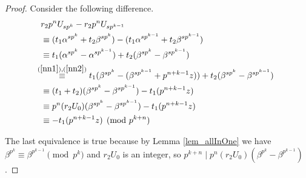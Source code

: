 \documentclass[preprint,12pt]{elsarticle}
\begin{document}
\begin{proof}
    Consider the following difference.
    \begin{equation}
        \begin{split}
        &r_2p^nU_{sp^k} - r_2p^nU_{sp^{k-1}}  
        \\ &\equiv (t_1\alpha^{sp^k}+t_2\beta^{sp^k}) -  (t_1\alpha^{sp^{k-1}}+t_2\beta^{sp^{k-1}}) 
        \\ &\equiv
        t_1(\alpha^{sp^k} - \alpha^{sp^{k-1}}) +t_2(\beta^{sp^k} -\beta^{sp^{k-1}})
        \\ &\!\!\!\!\overset{(\ref{nn1}),(\ref{nn2})}{\equiv}
        t_1(\beta^{sp^k} - (\beta^{sp^{k-1}}+p^{n+k-1}z)) +t_2(\beta^{sp^k} -\beta^{sp^{k-1}}) 
        \\ &\equiv
        (t_1+t_2)(\beta^{sp^k} - \beta^{sp^{k-1}}) -t_1(p^{n+k-1}z)
        \\ &\equiv
        p^n(r_2U_0)(\beta^{sp^k} - \beta^{sp^{k-1}}) -t_1(p^{n+k-1}z)
        \\ &\equiv
        -t_1(p^{n+k-1}z)  \pmod{p^{k+n}}
    \end{split}
    \end{equation}

    The last equivalence is true because by Lemma \ref{lem_allInOne} we have $\beta^{p^{k}} \equiv \beta^{p^{k-1}} \pmod{p^k}$ and  $r_2U_0$ is an integer, so $p^{k+n}\mid p^n(r_2U_0)(\beta^{p^{k}} -\beta^{p^{k-1}})$.



\end{proof}
\end{document}
